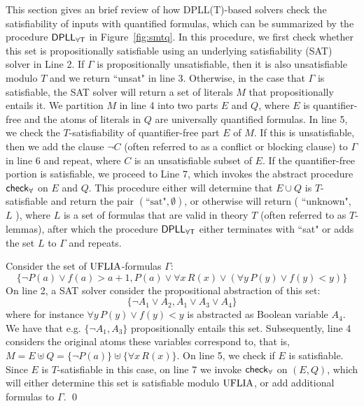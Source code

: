 \documentclass{easychair}
\begin{document}
This section gives an brief review of how DPLL(T)-based solvers check the satisfiability of
inputs with quantified formulas, which can be summarized by the procedure $\small\mathsf{DPLL_{\forall T}}$ in Figure~\ref{fig:smtq}.
In this procedure, we first check whether this set is propositionally satisfiable using
an underlying satisfiability (SAT) solver in Line 2.
If $\Gamma$ is propositionally unsatisfiable,
then it is also unsatisfiable modulo $T$ and we return ``unsat" in line 3.
Otherwise, in the case that $\Gamma$ is satisfiable, the SAT solver will return a set of literals $M$ that propositionally entails it.
We partition $M$ in line 4 into two parts $E$ and $Q$,
where $E$ is quantifier-free and the atoms of literals in $Q$ are universally quantified formulas.
In line 5, we check the $T$-satisfiability of quantifier-free part $E$ of $M$.
If this is unsatisfiable, then we add the clause $\neg C$ (often referred to as a conflict or blocking clause) to $\Gamma$ in line 6 and repeat,
where $C$ is an unsatisfiable subset of $E$.
If the quantifier-free portion is satisfiable,
we proceed to Line 7, which invokes the abstract procedure $\small\mathsf{check}_\forall$ on $E$ and $Q$.
This procedure either will determine that $E \cup Q$ is $T$-satisfiable and return the pair $( \text{``sat"}, \emptyset )$,
or otherwise will return ( ``unknown", $L$ ), where $L$ is a set of formulas that are valid in theory $T$ (often referred to as $T$-lemmas),
after which the procedure $\small\mathsf{DPLL_{\forall T}}$ either terminates with ``sat" or adds the set $L$ to $\Gamma$ and repeats.
\begin{example}
Consider the set of $\mathrm{UFLIA}$-formulas $\Gamma$:
\[
\{ \neg P(a) \vee f(a)>a+1, P( a ) \vee \forall x\, R( x ) \vee (\forall y\, P(y) \vee f( y ) < y) \}
\]
On line 2, a SAT solver consider the propositional abstraction of this set:
\[
\{ \neg A_1 \vee A_2, A_1 \vee A_3 \vee A_4 \}
\]
where for instance $\forall y\, P(y) \vee f( y ) < y$ is abstracted as Boolean variable $A_4$.
We have that e.g. $\{ \neg A_1, A_3 \}$ propositionally entails this set.
Subsequently, line 4 considers the original atoms these variables correspond to, that is,
$M = E \uplus Q = \{ \neg P( a ) \} \uplus \{ \forall x\, R( x ) \}$.
On line 5, we check if $E$ is satisfiable.
Since $E$ is $T$-satisfiable in this case, on line 7
we invoke $\small\mathsf{check}_\forall$ on $(E, Q)$, which will either determine this set is
satisfiable modulo $\mathrm{UFLIA}$, or add additional formulas to $\Gamma$. 
\qed
\end{example}
\end{document}
